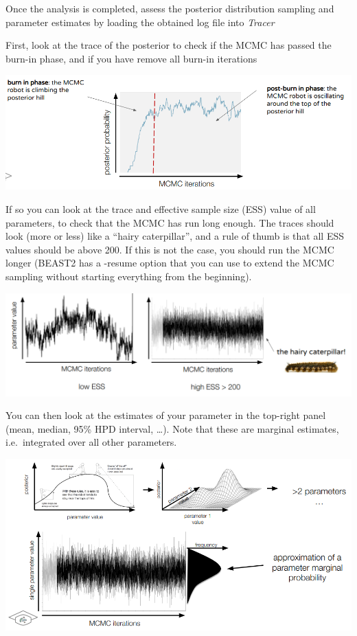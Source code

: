 \documentclass[
  letterpaper,
]{book}
\begin{document}
Once the analysis is completed, assess the posterior distribution
sampling and parameter estimates by loading the obtained log file into
\emph{Tracer}

First, look at the trace of the posterior to check if the MCMC has
passed the burn-in phase, and if you have remove all burn-in iterations

\includegraphics{assets/images/chapters/phylogenomics/32.png}

If so you can look at the trace and effective sample size (ESS) value of
all parameters, to check that the MCMC has run long enough. The traces
should look (more or less) like a ``hairy caterpillar'', and a rule of
thumb is that all ESS values should be above 200. If this is not the
case, you should run the MCMC longer (BEAST2 has a -resume option that
you can use to extend the MCMC sampling without starting everything from
the beginning).

\includegraphics{assets/images/chapters/phylogenomics/33.png}

You can then look at the estimates of your parameter in the top-right
panel (mean, median, 95\% HPD interval, \ldots). Note that these are
marginal estimates, i.e.~integrated over all other parameters.

\includegraphics{assets/images/chapters/phylogenomics/34.png}
\end{document}
